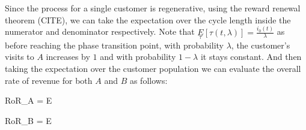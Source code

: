 Since the process for a single customer is regenerative, using the reward renewal theorem (CITE), we can take the expectation over the cycle length inside the numerator and denominator respectively.
Note that $\underset{\tau}E[\tau(t,\lambda)] = \frac{i_0(t)}{\lambda}$ as before reaching the phase transition point, with probability $\lambda$, the customer's visits to $A$ increases by $1$ and with probability $1-\lambda$ it stays constant.
And then taking the expectation over the customer population we can evaluate the overall rate of revenue for both $A$ and $B$ as follows:

\beq
RoR_A = E
\eeq

\beq
RoR_B = E
\eeq
